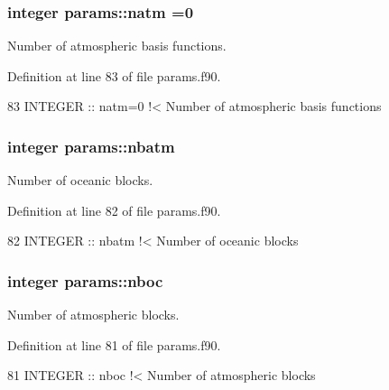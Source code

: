 \subsubsection[{\texorpdfstring{natm}{natm}}]{\setlength{\rightskip}{0pt plus 5cm}integer params\+::natm =0}\hypertarget{namespaceparams_a4f46551b6a8ad183d2dced1da3dc5fed}{}\label{namespaceparams_a4f46551b6a8ad183d2dced1da3dc5fed}


Number of atmospheric basis functions. 



Definition at line 83 of file params.\+f90.


\begin{DoxyCode}
83   \textcolor{keywordtype}{INTEGER} :: natm=0\textcolor{comment}{ !< Number of atmospheric basis functions}
\end{DoxyCode}
\subsubsection[{\texorpdfstring{nbatm}{nbatm}}]{\setlength{\rightskip}{0pt plus 5cm}integer params\+::nbatm}\hypertarget{namespaceparams_aa5dc201b0a59d8bb25a5dc52d2ed3cac}{}\label{namespaceparams_aa5dc201b0a59d8bb25a5dc52d2ed3cac}


Number of oceanic blocks. 



Definition at line 82 of file params.\+f90.


\begin{DoxyCode}
82   \textcolor{keywordtype}{INTEGER} :: nbatm\textcolor{comment}{  !< Number of oceanic blocks}
\end{DoxyCode}
\subsubsection[{\texorpdfstring{nboc}{nboc}}]{\setlength{\rightskip}{0pt plus 5cm}integer params\+::nboc}\hypertarget{namespaceparams_a54123b5a947703d21d0c882dec6780ac}{}\label{namespaceparams_a54123b5a947703d21d0c882dec6780ac}


Number of atmospheric blocks. 



Definition at line 81 of file params.\+f90.


\begin{DoxyCode}
81   \textcolor{keywordtype}{INTEGER} :: nboc\textcolor{comment}{   !< Number of atmospheric blocks}
\end{DoxyCode}
